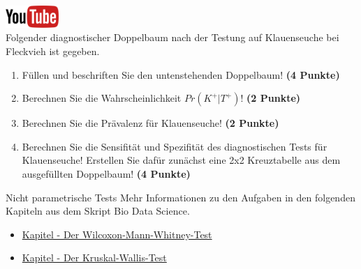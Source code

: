 \documentclass[a4paper, 9pt]{scrartcl}\usepackage[]{graphicx}\usepackage[]{xcolor}
\begin{document}
\hfill\href{https://youtu.be/_7s44pbOc00}{\includegraphics[width =
  2cm]{img/youtube}}\\[1Ex]





Folgender diagnostischer Doppelbaum nach der Testung auf Klauenseuche bei
Fleckvieh ist gegeben.

\begin{enumerate}
\item F{\"u}llen und beschriften Sie den untenstehenden Doppelbaum! \textbf{(4
    Punkte)}
\item Berechnen Sie die Wahrscheinlichkeit $Pr(K^+|T^+)$! \textbf{(2 Punkte)}
\item Berechnen Sie die Pr{\"a}valenz f{\"u}r Klauenseuche! \textbf{(2 Punkte)}
\item Berechnen Sie die Sensifit{\"a}t und Spezifit{\"a}t des diagnostischen Tests
  f{\"u}r Klauenseuche! Erstellen Sie daf{\"u}r zun{\"a}chst eine 2x2 Kreuztabelle aus
  dem ausgef{\"u}llten Doppelbaum!
  \textbf{(4 Punkte)}
\end{enumerate}

\vspace{1cm}
 




 
\clearpage
\begin{graybox}{Nicht parametrische Tests}
Mehr Informationen zu den Aufgaben in den folgenden Kapiteln aus dem Skript Bio Data Science.
  \begin{itemize}
  \item \href{https://jkruppa.github.io/stat-tests-utest.html}{Kapitel - Der Wilcoxon-Mann-Whitney-Test}
  \item \href{https://jkruppa.github.io/stat-tests-kruskal.html}{Kapitel - Der Kruskal-Wallis-Test}
  \end{itemize}
\end{graybox}
\clearpage
\end{document}

